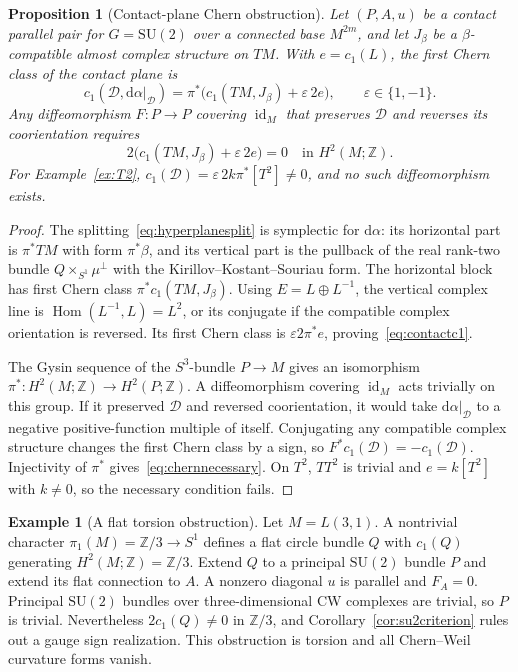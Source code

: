 \documentclass[11pt]{amsart}
\newcommand{\dd}{\mathrm d}
\newcommand{\Z}{\mathbb Z}
\newcommand{\id}{\operatorname{id}}
\theoremstyle{plain}
\newtheorem{proposition}[theorem]{Proposition}
\theoremstyle{definition}
\newtheorem{example}[theorem]{Example}
\theoremstyle{remark}
\begin{document}
\begin{proposition}[Contact-plane Chern obstruction]\label{prop:contactChern}
Let $(P,A,u)$ be a contact parallel pair for $G=\mathrm{SU}(2)$ over a connected base $M^{2m}$, and let $J_\beta$ be a $\beta$-compatible almost complex structure on $TM$.  With $e=c_1(L)$, the first Chern class of the contact plane is
\begin{equation}\label{eq:contactc1}
 c_1(\mathcal D,\dd\alpha|_{\mathcal D})
 =\pi^*\bigl(c_1(TM,J_\beta)+\varepsilon\,2e\bigr),
 \qquad \varepsilon\in\{1,-1\}.
\end{equation}
Any diffeomorphism $F:P\to P$ covering $\id_M$ that preserves $\mathcal D$ and reverses its coorientation requires
\begin{equation}\label{eq:chernnecessary}
 2\bigl(c_1(TM,J_\beta)+\varepsilon\,2e\bigr)=0
 \quad\text{in }H^2(M;\Z).
\end{equation}
For Example~\ref{ex:T2}, $c_1(\mathcal D)=\varepsilon\,2k\pi^*[T^2]\ne0$, and no such diffeomorphism exists.
\end{proposition}

\begin{proof}
The splitting~\eqref{eq:hyperplanesplit} is symplectic for $\dd\alpha$: its horizontal part is $\pi^*TM$ with form $\pi^*\beta$, and its vertical part is the pullback of the real rank-two bundle $Q\times_{S^1}\mu^\perp$ with the Kirillov--Kostant--Souriau form.  The horizontal block has first Chern class $\pi^*c_1(TM,J_\beta)$.  Using $E=L\oplus L^{-1}$, the vertical complex line is $\operatorname{Hom}(L^{-1},L)=L^2$, or its conjugate if the compatible complex orientation is reversed.  Its first Chern class is $\varepsilon 2\pi^*e$, proving~\eqref{eq:contactc1}.

The Gysin sequence of the $S^3$-bundle $P\to M$ gives an isomorphism $\pi^*:H^2(M;\Z)\to H^2(P;\Z)$.  A diffeomorphism covering $\id_M$ acts trivially on this group.  If it preserved $\mathcal D$ and reversed coorientation, it would take $\dd\alpha|_{\mathcal D}$ to a negative positive-function multiple of itself.  Conjugating any compatible complex structure changes the first Chern class by a sign, so $F^*c_1(\mathcal D)=-c_1(\mathcal D)$.  Injectivity of $\pi^*$ gives~\eqref{eq:chernnecessary}.  On $T^2$, $TT^2$ is trivial and $e=k[T^2]$ with $k\ne0$, so the necessary condition fails.
\end{proof}

\begin{example}[A flat torsion obstruction]
Let $M=L(3,1)$.  A nontrivial character $\pi_1(M)=\Z/3\to S^1$ defines a flat circle bundle $Q$ with $c_1(Q)$ generating $H^2(M;\Z)=\Z/3$.  Extend $Q$ to a principal $\mathrm{SU}(2)$ bundle $P$ and extend its flat connection to $A$.  A nonzero diagonal $u$ is parallel and $F_A=0$.  Principal $\mathrm{SU}(2)$ bundles over three-dimensional CW complexes are trivial, so $P$ is trivial.  Nevertheless $2c_1(Q)\ne0$ in $\Z/3$, and Corollary~\ref{cor:su2criterion} rules out a gauge sign realization.  This obstruction is torsion and all Chern--Weil curvature forms vanish.
\end{example}
\end{document}
